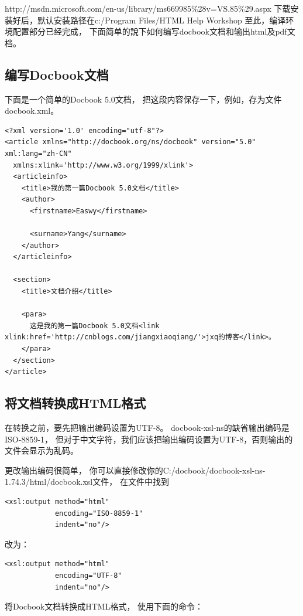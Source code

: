 \documentclass{book}
\begin{document}
http://msdn.microsoft.com/en-us/library/ms669985\%28v=VS.85\%29.aspx
下载安装好后，默认安装路径在c:/Program Files/HTML Help Workshop
至此，编译环境配置部分已经完成，
下面简单的說下如何编写docbook文档和输出html及pdf文档。

\subsection{编写Docbook文档}

下面是一个简单的Docbook 5.0文档，
把这段内容保存一下，例如，存为文件docbook.xml。

\begin{lstlisting}
<?xml version='1.0' encoding="utf-8"?>
<article xmlns="http://docbook.org/ns/docbook" version="5.0" xml:lang="zh-CN"
  xmlns:xlink='http://www.w3.org/1999/xlink'>
  <articleinfo>
    <title>我的第一篇Docbook 5.0文档</title>
    <author>
      <firstname>Easwy</firstname>

      <surname>Yang</surname>
    </author>
  </articleinfo> 
                  
  <section>   
    <title>文档介绍</title>

    <para>
      这是我的第一篇Docbook 5.0文档<link xlink:href='http://cnblogs.com/jiangxiaoqiang/'>jxq的博客</link>。
    </para>
  </section>
</article>
\end{lstlisting}

\subsection{将文档转换成HTML格式}

 在转换之前，要先把输出编码设置为UTF-8。
 docbook-xsl-ns的缺省输出编码是ISO-8859-1，
 但对于中文字符，我们应该把输出编码设置为UTF-8，否则输出的文件会显示为乱码。

更改输出编码很简单，
你可以直接修改你的C:/docbook/docbook-xsl-ns-1.74.3/html/docbook.xsl文件，
在文件中找到 

\begin{lstlisting}
<xsl:output method="html"
            encoding="ISO-8859-1"
            indent="no"/>
\end{lstlisting}

改为：

\begin{lstlisting}
<xsl:output method="html"
            encoding="UTF-8"
            indent="no"/>
\end{lstlisting}

将Docbook文档转换成HTML格式，
使用下面的命令：
\end{document}
